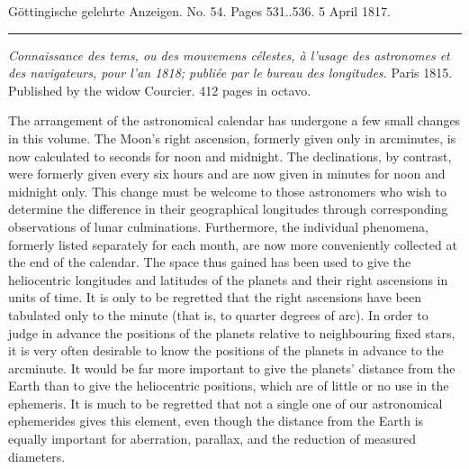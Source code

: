 \clearpage
{}
\hypertarget{native-600-lower}{}

\begin{center}\small Göttingische gelehrte Anzeigen. No. 54. Pages 531..536. 5 April 1817.\\[3pt]\rule{.72\linewidth}{.3pt}\end{center}

\emph{Connaissance des tems, ou des mouvemens célestes, à l'usage des astronomes et des navigateurs, pour l'an \textup{1818}; publiée par le bureau des longitudes.} Paris 1815. Published by the widow Courcier. 412 pages in octavo.

The arrangement of the astronomical calendar has undergone a few small changes in this volume. The Moon's right ascension, formerly given only in arcminutes, is now calculated to seconds for noon and midnight. The declinations, by contrast, were formerly given every six hours and are now given in minutes for noon and midnight only. This change must be welcome to those astronomers who wish to determine the difference in their geographical longitudes through corresponding observations of lunar culminations. Furthermore, the individual phenomena, formerly listed separately for each month, are now more conveniently collected at the end of the calendar. The space thus gained has been used to give the heliocentric longitudes and latitudes of the planets and their right ascensions in units of time. It is only to be regretted that the right ascensions have been tabulated only to the minute (that is, to quarter degrees of arc). In order to judge in advance the positions of the planets relative to neighbouring fixed stars, it is very often desirable to know the positions of the planets in advance to the arcminute. It would be far more important to give the planets' distance from the Earth than to give the heliocentric positions, which are of little or no use in the ephemeris. It is much to be regretted that not a single one of our astronomical ephemerides gives this element, even though the distance from the Earth is equally important for aberration, parallax, and the reduction of measured diameters.


